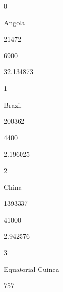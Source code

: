\documentclass[letterpaper,10pt,english]{sphinxmanual}
\begin{document}
0





Angola





21472





6900





32.134873









1





Brazil





200362





4400





2.196025









2





China





1393337





41000





2.942576









3





Equatorial Guinea





757
\end{document}
